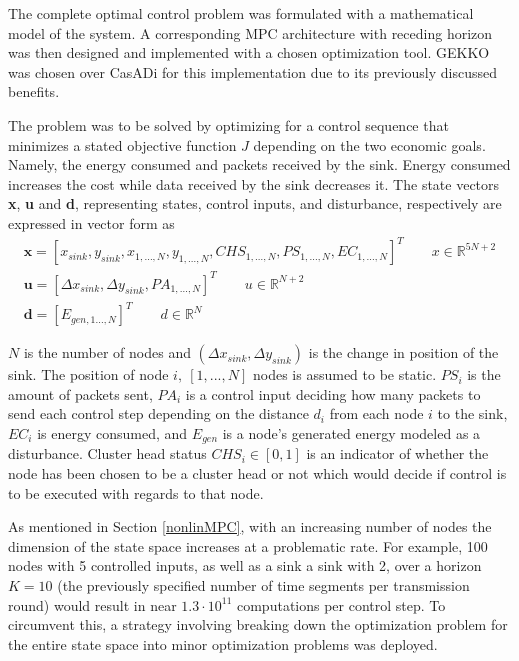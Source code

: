 \noindent The complete optimal control problem was formulated with a mathematical model of the system. A corresponding MPC architecture with receding horizon was then designed and implemented with a chosen optimization tool. GEKKO was chosen over CasADi for this implementation due to its previously discussed benefits.\newline

\noindent The problem was to be solved by optimizing for a control sequence that minimizes a stated objective function $J$ depending on the two economic goals. Namely, the energy consumed and packets received by the sink. Energy consumed increases the cost while data received by the sink decreases it.
The state vectors \textbf{x}, \textbf{u} and \textbf{d}, representing states, control inputs, and disturbance, respectively are expressed in vector form as
\begin{align}
\label{x_k}
    \textbf{x} = [x_{sink}, y_{sink}, x_{1,\hdots,N}, y_{1,\hdots,N}, CHS_{1,\hdots,N}, PS_{1,\hdots,N}, EC_{1,\hdots,N}]^{T} \qquad x \in  \mathbb{R}^{5N+2}\\
    \textbf{u} = [\Delta x_{sink}, \Delta y_{sink}, PA_{1,\hdots,N}]^{T} \qquad u \in  \mathbb{R}^{N+2}\\
    \textbf{d} = [E_{gen,1\hdots,N}]^{T} \qquad d \in  \mathbb{R}^{N}
\end{align}

\noindent $N$ is the number of nodes and $(\Delta x_{sink}, \Delta y_{sink})$ is the change in position of the sink. The position of node $i,\:[1,...,N]$ nodes is assumed to be static. $PS_i$ is the amount of packets sent, $PA_i$ is a control input deciding how many packets to send each control step depending on the distance $d_i$ from each node $i$ to the sink, $EC_i$ is energy consumed, and $E_{gen}$ is a node's generated energy modeled as a disturbance. Cluster head status $CHS_i \in [0,1]$ is an indicator of whether the node has been chosen to be a cluster head or not which would decide if control is to be executed with regards to that node. \newline

\noindent As mentioned in Section \ref{nonlinMPC}, with an increasing number of nodes the dimension of the state space increases at a problematic rate. For example, 100 nodes with 5 controlled inputs, as well as a sink a sink with 2, over a horizon $K=10$ (the previously specified number of time segments per transmission round) would result in near $1.3\cdot10^{11}$ computations per control step.
To circumvent this, a strategy involving breaking down the optimization problem for the entire state space into minor optimization problems was deployed.\newline

